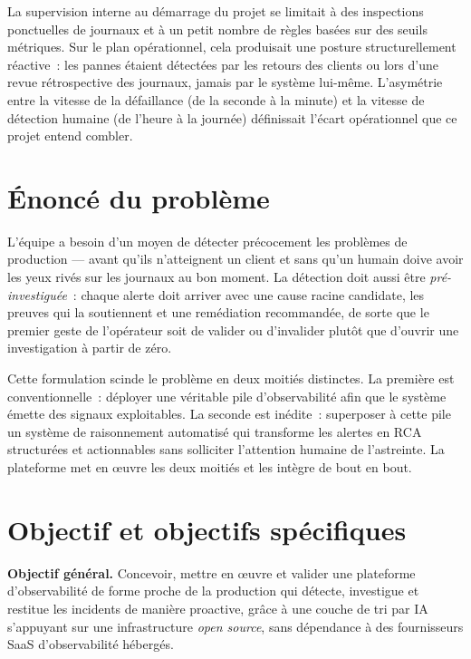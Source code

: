 \documentclass[11pt,a4paper,oneside]{report}
\begin{document}
La supervision interne au démarrage du projet se limitait à des
inspections ponctuelles de journaux et à un petit nombre de règles
basées sur des seuils métriques. Sur le plan opérationnel, cela
produisait une posture structurellement réactive~: les pannes étaient
détectées par les retours des clients ou lors d'une revue
rétrospective des journaux, jamais par le système lui-même.
L'asymétrie entre la vitesse de la défaillance (de la seconde à la
minute) et la vitesse de détection humaine (de l'heure à la journée)
définissait l'écart opérationnel que ce projet entend combler.

\section{Énoncé du problème}

\begin{notebox}[title={Énoncé du problème (issu des recherches de terrain du sprint 0)}]
L'équipe a besoin d'un moyen de détecter précocement les problèmes
de production --- avant qu'ils n'atteignent un client et sans
qu'un humain doive avoir les yeux rivés sur les journaux au bon
moment. La détection doit aussi être \emph{pré-investiguée}~: chaque
alerte doit arriver avec une cause racine candidate, les preuves qui
la soutiennent et une remédiation recommandée, de sorte que le premier
geste de l'opérateur soit de valider ou d'invalider plutôt que
d'ouvrir une investigation à partir de zéro.
\end{notebox}

Cette formulation scinde le problème en deux moitiés distinctes. La
première est conventionnelle~: déployer une véritable pile
d'observabilité afin que le système émette des signaux exploitables.
La seconde est inédite~: superposer à cette pile un système de
raisonnement automatisé qui transforme les alertes en RCA
structurées et actionnables sans solliciter l'attention humaine de
l'astreinte. La plateforme met en \oe{}uvre les deux moitiés et les
intègre de bout en bout.

\section{Objectif et objectifs spécifiques}

\textbf{Objectif général.} Concevoir, mettre en \oe{}uvre et valider
une plateforme d'observabilité de forme proche de la production qui
détecte, investigue et restitue les incidents de manière proactive,
grâce à une couche de tri par IA s'appuyant sur une infrastructure
\emph{open source}, sans dépendance à des fournisseurs SaaS
d'observabilité hébergés.
\end{document}
